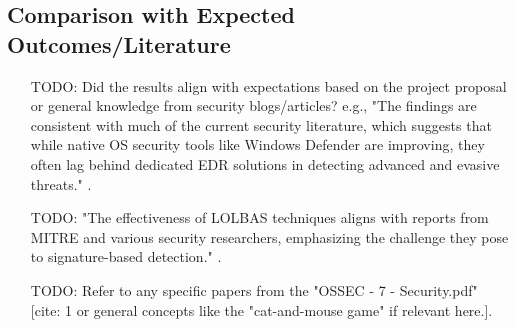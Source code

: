 \documentclass[11pt]{article}
\begin{document}
	\subsection{Comparison with Expected Outcomes/Literature}
	\begin{itemize}
		\item [TODO: Did the results align with expectations based on the project proposal or general knowledge from security blogs/articles? e.g., "The findings are consistent with much of the current security literature, which suggests that while native OS security tools like Windows Defender are improving, they often lag behind dedicated EDR solutions in detecting advanced and evasive threats."].
		\item [TODO: "The effectiveness of LOLBAS techniques aligns with reports from MITRE and various security researchers, emphasizing the challenge they pose to signature-based detection."].
		\item [TODO: Refer to any specific papers from the "OSSEC - 7 - Security.pdf" [cite: 1] or general concepts like the "cat-and-mouse game" if relevant here.].
	\end{itemize}
	
\end{document}
